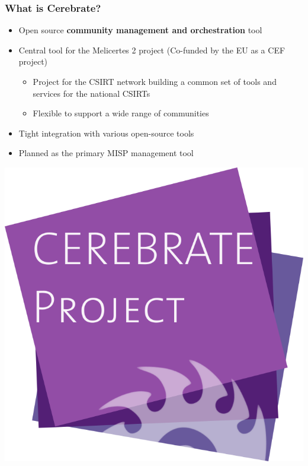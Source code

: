 \begin{frame}
    \frametitle{What is Cerebrate?}
    \begin{itemize}
        \item Open source {\bf community management and orchestration} tool
        \item Central tool for the Melicertes 2 project (Co-funded by the EU as a CEF project)
        \begin{itemize}
            \item Project for the CSIRT network building a common set of tools and services for the national CSIRTs
            \item Flexible to support a wide range of communities
        \end{itemize}
        \item Tight integration with various open-source tools
        \item Planned as the primary MISP management tool
    \end{itemize}
    \includegraphics[scale=0.3]{pictures/cerebrate-logo.png}
\end{frame}

